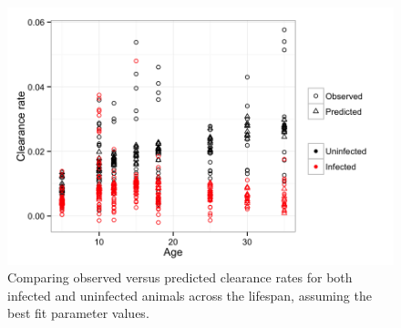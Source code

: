 \documentclass[12pt,reqno,final,pdftex]{amsart}\usepackage[]{graphicx}\usepackage[]{color}
\newenvironment{knitrout}{}{} %
\theoremstyle{plain}
\numberwithin{equation}{part}
\begin{document}
\begin{knitrout}\scriptsize
{}\color{fgcolor}\begin{figure}

\includegraphics[width=\linewidth]{figure/clearance-thru-time-1} \hfill{}

\caption[Comparing observed versus predicted clearance rates for both infected and uninfected animals across the lifespan, assuming the best fit parameter values]{Comparing observed versus predicted clearance rates for both infected and uninfected animals across the lifespan, assuming the best fit parameter values.}\label{fig:clearance-thru-time}
\end{figure}


\end{knitrout}
\end{document}
